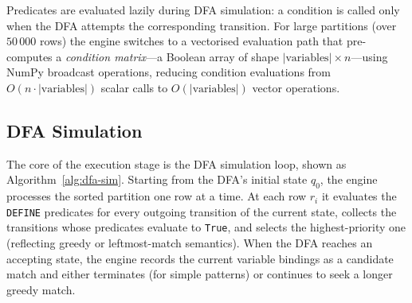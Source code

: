 \noindent
Predicates are evaluated lazily during DFA simulation: a condition
is called only when the DFA attempts the corresponding transition.
For large partitions (over $50\,000$ rows) the engine switches to a
vectorised evaluation path that pre-computes a
\emph{condition matrix}—a Boolean array of shape
$|\text{variables}| \times n$—using NumPy broadcast operations,
reducing condition evaluations from $O(n \cdot |\text{variables}|)$
scalar calls to $O(|\text{variables}|)$ vector operations.

\subsection{DFA Simulation}
\label{subsec:meth-exec-dfa-sim}

The core of the execution stage is the DFA simulation loop, shown
as Algorithm~\ref{alg:dfa-sim}.  Starting from the DFA's initial
state $q_0$, the engine processes the sorted partition one row at a
time.  At each row $r_i$ it evaluates the \texttt{DEFINE} predicates
for every outgoing transition of the current state, collects the
transitions whose predicates evaluate to \texttt{True}, and selects
the highest-priority one (reflecting greedy or leftmost-match
semantics).  When the DFA reaches an accepting state, the engine
records the current variable bindings as a candidate match and
either terminates (for simple patterns) or continues to seek a
longer greedy match.

\begin{algorithm}[htbp]
\caption{DFA Simulation Loop for a Single Partition}
\label{alg:dfa-sim}
\DontPrintSemicolon
\SetAlgoLined
{}
\end{algorithm}

